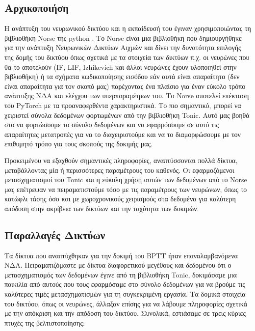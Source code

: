 \documentclass[12pt]{report}
\begin{document}
\subsection{Αρχικοποιήση}

Η ανάπτυξη του νευρωνικού δικτύου και η εκπαίδευσή του έγιναν χρησιμοποιώντας τη βιβλιοθήκη \textlatin{Norse} της python \cite{norse2021}. Το \textlatin{Norse} είναι μια βιβλιοθήκη που δημιουργήθηκε για την ανάπτυξη Νευρωνικών Δικτύων Αιχμών και δίνει την δυνατότητα επιλογής της δομής του δικτύου όπως σχετικά με τα στοιχεία των δικτύων π.χ. οι νευρώνες που θα το αποτελούν (\textlatin{IF}, \textlatin{LIF}, \textlatin{Izhikevich} και άλλοι νευρώνες έχουν υλοποιηθεί στην βιβλιοθήκη) ή τα σχήματα κωδικοποίησης εισόδου εάν αυτά είναι απαραίτητα (δεν είναι απαραίτητα για τον σκοπό μας) παρέχοντας ένα πλαίσιο για έναν εύκολο τρόπο ανάπτυξης ΝΔΑ και ελέγχου των υπερπαραμέτρων του. Το \textlatin{Norse} αποτελεί επέκταση του \textlatin{PyTorch} με τα προαναφερθέντα χαρακτηριστικά. Το πιο σημαντικό, μπορεί να χειριστεί σύνολα δεδομένων φορτωμένων από την βιβλιοθήκη \textlatin{Tonic}. Αυτό μας βοηθά στο να φορτώσουμε το σύνολο δεδομένων και να εφαρμόσουμε σε αυτό τις απαραίτητες μετατροπές για να το διαχειριστούμε και να το διαμορφώσουμε με τον επιθυμητό τρόπο για τους σκοπούς της δοκιμής μας.

Προκειμένου να εξαχθούν σημαντικές πληροφορίες, αναπτύσσονται πολλά δίκτυα, μεταβάλλοντας μία ή περισσότερες παραμέτρους του καθενός. Οι εφαρμοζόμενοι μετασχηματισμοί του \textlatin{Tonic} και η εύκολη χρήση αυτών των δεδομένων από το \textlatin{Norse} μας επέτρεψαν να πειραματιστούμε τόσο με τις παραμέτρους των νευρώνων, όπως το κατώφλι τάσης όσο και με χωροχρονικούς χειρισμούς στα δεδομένα για καλύτερη απόδοση στην ακρίβεια των δικτύων και την ταχύτητα των δοκιμών.

\subsection{Παραλλαγές Δικτύων}

Τα δίκτυα που αναπτύχθηκαν για την δοκιμή του \textlatin{BPTT} ήταν επαναλαμβανόμενα ΝΔΑ. Πειραματιζόμαστε με δίκτυα διαφορετικού μεγέθους και δεδομένου ότι ο μετασχηματισμός των δεδομένων έγινε από τη βιβλιοθήκη \textlatin{Tonic}, δοκιμάσαμε μια ποικιλία από αυτούς που τους εφαρμόσαμε στο σύνολο δεδομένων για να βρούμε τις καλύτερες τιμές μετασχηματισμών για τη συγκεκριμένη εργασία. Τα δομικά στοιχεία του δικτύου, όπως οι νευρώνες, άλλαξαν επίσης για να λάβουμε πληροφορίες σχετικά με την απόκριση και την απόδοση του δικτύου. Συνολικά, εστιάσαμε σε τρεις κύριες πτυχές της βελτιστοποίησης:
\end{document}
